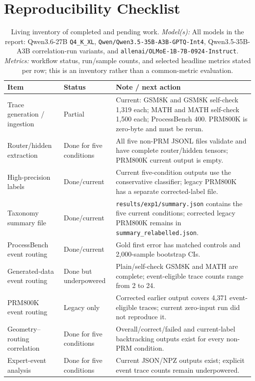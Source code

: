 \documentclass[manuscript,screen,review]{jair}
\newcommand{\modelmetrics}[2]{\textit{Model(s):} #1. \textit{Metrics:} #2.}
\begin{document}
\section{Reproducibility Checklist}

\begin{table}[h]
\centering
\scriptsize
\caption{Living inventory of completed and pending work.
\modelmetrics{All models in the report: Qwen3.6-27B \texttt{Q4\_K\_XL},
\texttt{Qwen/Qwen3.5-35B-A3B-GPTQ-Int4}, Qwen3.5-35B-A3B correlation-run
variants, and \texttt{allenai/OLMoE-1B-7B-0924-Instruct}}{workflow status,
run/sample counts, and selected headline metrics stated per row; this is an
inventory rather than a common-metric evaluation}}
\label{tab:status}
\begin{tabular}{p{}p{}p{}}
\toprule
Item & Status & Note / next action \\
\midrule
Trace generation / ingestion & Partial & Current: GSM8K and GSM8K self-check 1,319 each; MATH and MATH self-check 1,500 each; ProcessBench 400. PRM800K is zero-byte and must be rerun. \\
Router/hidden extraction & Done for five conditions & All five non-PRM JSONL files validate and have complete router/hidden tensors; PRM800K current output is empty. \\
High-precision labels & Done/current & Current five-condition outputs use the conservative classifier; legacy PRM800K has a separate corrected-label file. \\
Taxonomy summary file & Done/current & \texttt{results/exp1/summary.json} contains the five current conditions; corrected legacy PRM800K remains in \texttt{summary\_relabelled.json}. \\
ProcessBench event routing & Done/current & Gold first error has matched controls and 2,000-sample bootstrap CIs. \\
Generated-data event routing & Done but underpowered & Plain/self-check GSM8K and MATH are complete; event-eligible trace counts range from 2 to 24. \\
PRM800K event routing & Legacy only & Corrected earlier output covers 4,371 event-eligible traces; current zero-input run did not reproduce it. \\
Geometry--routing correlation & Done for five conditions & Overall/correct/failed and current-label backtracking outputs exist for every non-PRM condition. \\
Expert-event analysis & Done for five conditions & Current JSON/NPZ outputs exist; explicit event trace counts remain underpowered. \\

\end{tabular}
\end{table}
\end{document}
